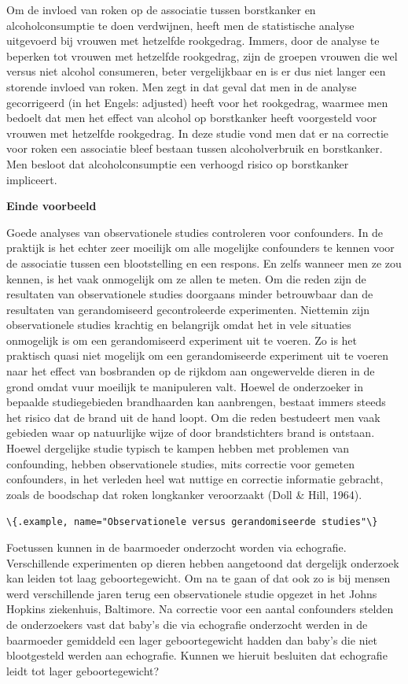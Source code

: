 \documentclass[
  12pt,dutch,coursenotes]{book}
\newcommand{\passthrough}[1]{#1}
\begin{document}
Om de invloed van roken op de associatie tussen borstkanker en
alcoholconsumptie te doen verdwijnen, heeft men de statistische analyse
uitgevoerd bij vrouwen met hetzelfde rookgedrag. Immers, door de analyse te
beperken tot vrouwen met hetzelfde rookgedrag, zijn de groepen vrouwen die
wel versus niet alcohol consumeren, beter vergelijkbaar en is er dus niet
langer een storende invloed van roken. Men zegt in dat geval dat men in de
analyse gecorrigeerd (in het Engels: adjusted) heeft voor het
rookgedrag, waarmee men bedoelt dat men het effect van alcohol op
borstkanker heeft voorgesteld voor vrouwen met hetzelfde rookgedrag. In deze
studie vond men dat er na correctie voor roken een associatie bleef bestaan
tussen alcoholverbruik en borstkanker. Men besloot dat alcoholconsumptie een
verhoogd risico op borstkanker impliceert.

\textbf{Einde voorbeeld}

Goede analyses van observationele studies controleren voor confounders. In
de praktijk is het echter zeer moeilijk om alle mogelijke confounders te
kennen voor de associatie tussen een blootstelling en een respons. En zelfs
wanneer men ze zou kennen, is het vaak onmogelijk om ze allen te meten. Om
die reden zijn de resultaten van observationele studies doorgaans minder
betrouwbaar dan de resultaten van gerandomiseerd gecontroleerde
experimenten. Niettemin zijn observationele studies krachtig en belangrijk
omdat het in vele situaties onmogelijk is om een gerandomiseerd experiment
uit te voeren. Zo is het praktisch quasi niet mogelijk om een
gerandomiseerde experiment uit te voeren naar het effect van bosbranden op de rijkdom aan ongewervelde dieren in de grond omdat vuur moeilijk te manipuleren valt. Hoewel de onderzoeker in bepaalde studiegebieden brandhaarden kan aanbrengen, bestaat immers steeds het risico dat de brand uit de hand loopt. Om die reden bestudeert men vaak gebieden waar op natuurlijke wijze of door brandstichters brand is ontstaan. Hoewel dergelijke studie typisch te kampen hebben met problemen van confounding, hebben observationele studies, mits correctie
voor gemeten confounders, in het verleden heel wat nuttige en correctie informatie gebracht, zoals de boodschap dat roken longkanker veroorzaakt (Doll \& Hill, 1964).

\passthrough{\lstinline!\{.example, name="Observationele versus gerandomiseerde studies"\}!}

Foetussen kunnen in de baarmoeder onderzocht worden via
echografie. Verschillende experimenten op dieren hebben aangetoond dat
dergelijk onderzoek kan leiden tot laag geboortegewicht. Om na te gaan of
dat ook zo is bij mensen werd verschillende jaren terug een observationele
studie opgezet in het Johns Hopkins ziekenhuis, Baltimore. Na correctie voor
een aantal confounders stelden de onderzoekers vast dat baby's die via
echografie onderzocht werden in de baarmoeder gemiddeld een lager
geboortegewicht hadden dan baby's die niet blootgesteld werden aan
echografie. Kunnen we hieruit besluiten dat echografie leidt tot lager
geboortegewicht?
\end{document}
